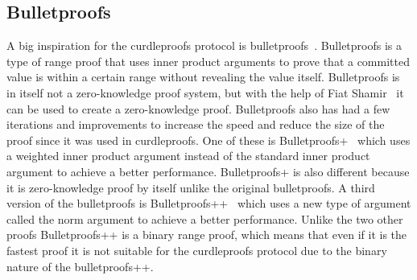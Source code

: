 \subsection{Bulletproofs}\label{sec:related-work-bulletproofs}
A big inspiration for the curdleproofs protocol is bulletproofs~\cite{bunz2018bulletproofs}.
Bulletproofs is a type of range proof that uses inner product arguments to prove that a committed value is within a certain range without revealing the value itself.
Bulletproofs is in itself not a zero-knowledge proof system, but with the help of Fiat Shamir~\cite{bunz2018bulletproofs} it can be used to create a zero-knowledge proof.
Bulletproofs also has had a few iterations and improvements to increase the speed and reduce the size of the proof since it was used in curdleproofs.
One of these is Bulletproofs+~\cite{chung2022bulletproofs+} which uses a weighted inner product argument instead of the standard inner product argument to achieve a better performance.
Bulletproofs+ is also different because it is zero-knowledge proof by itself unlike the original bulletproofs.
A third version of the bulletproofs is Bulletproofs++~\cite{eagen2024bulletproofs++} which uses a new type of argument called the norm argument to achieve a better performance.
Unlike the two other proofs Bulletproofs++ is a binary range proof, which means that even if it is the fastest proof it is not suitable for the curdleproofs protocol due to the binary nature of the bulletproofs++.